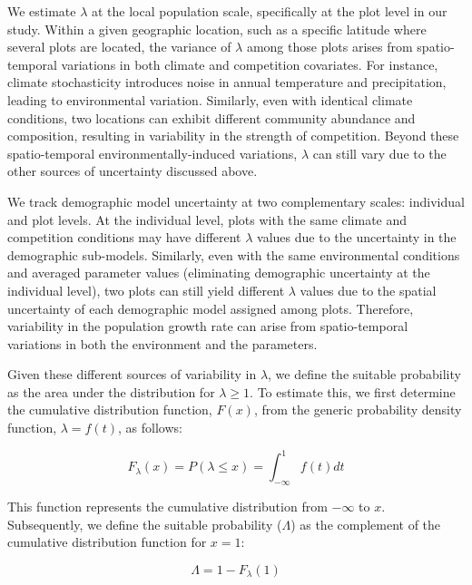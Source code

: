 We estimate \(\lambda\) at the local population scale, specifically at
the plot level in our study. Within a given geographic location, such as
a specific latitude where several plots are located, the variance of
\(\lambda\) among those plots arises from spatio-temporal variations in
both climate and competition covariates. For instance, climate
stochasticity introduces noise in annual temperature and precipitation,
leading to environmental variation. Similarly, even with identical
climate conditions, two locations can exhibit different community
abundance and composition, resulting in variability in the strength of
competition. Beyond these spatio-temporal environmentally-induced
variations, \(\lambda\) can still vary due to the other sources of
uncertainty discussed above.

We track demographic model uncertainty at two complementary scales:
individual and plot levels. At the individual level, plots with the same
climate and competition conditions may have different \(\lambda\) values
due to the uncertainty in the demographic sub-models. Similarly, even
with the same environmental conditions and averaged parameter values
(eliminating demographic uncertainty at the individual level), two plots
can still yield different \(\lambda\) values due to the spatial
uncertainty of each demographic model assigned among plots. Therefore,
variability in the population growth rate can arise from spatio-temporal
variations in both the environment and the parameters.

Given these different sources of variability in \(\lambda\), we define
the suitable probability as the area under the distribution for
\(\lambda \geq 1\). To estimate this, we first determine the cumulative
distribution function, \(F(x)\), from the generic probability density
function, \(\lambda = f(t)\), as follows:

\begin{equation}
F_{\lambda}(x) = P(\lambda \le x) = \int_{-\infty}^{1} f(t)dt
\label{eq:cdf}\end{equation}

This function represents the cumulative distribution from \(-\infty\) to
\(x\). Subsequently, we define the suitable probability (\(\Lambda\)) as
the complement of the cumulative distribution function for \(x = 1\):

\begin{equation}
  \Lambda = 1 - F_{\lambda}(1)
\label{eq:sp}\end{equation}

